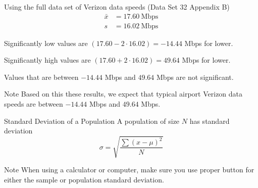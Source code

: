 \documentclass{beamer}
\begin{document}
\begin{frame}
\begin{example}
Using the full data set of Verizon data speeds (Data Set 32 Appendix B)
\begin{equation*}
\begin{aligned}
\bar{x} &= 17.60~\text{Mbps}\\
s &= 16.02~\text{Mbps} 
\end{aligned}
\end{equation*}\pause

Significantly low values are $(17.60-2\cdot 16.02)=-14.44$ Mbps for lower.\pause

\vspace{2mm}
Significantly high values are $(17.60+2\cdot 16.02)=49.64$ Mbps for lower.\pause

\vspace{2mm}
Values that are between $-14.44$ Mbps and $49.64$ Mbps are not significant.
\end{example}\pause

\begin{block}{Note}
Based on this these results, we expect that typical airport Verizon data speeds are between $-14.44$ Mbps and $49.64$ Mbps.
\end{block}
\end{frame}

\begin{frame}
\begin{block}{Standard Deviation of a Population}
A population of size $N$ has standard deviation
\begin{equation*}
\sigma = \sqrt{\dfrac{\sum{(x-\mu)}^2}{N}}
\end{equation*}
\end{block}\pause

\begin{block}{Note}
When using a calculator or computer, make sure you use proper button for either the sample or population standard deviation.
\end{block}
\end{frame}
\end{document}
